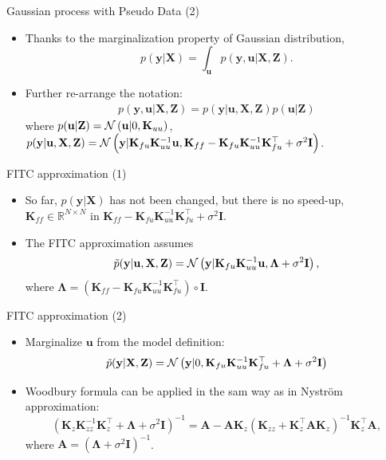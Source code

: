 \documentclass[14pt,aspectratio=1610]{beamer}
\newcommand{\yV}{\mathbf{y}}
\newcommand{\xM}{\mathbf{X}}
\newcommand{\K}{\mathbf{K}}
\newcommand{\R}{\mathbb{R}}
\newcommand{\uV}{\mathbf{u}}
\newcommand{\zM}{\mathbf{Z}}
\newcommand{\I}{\mathbf{I}}
\newcommand{\lambdaM}{\mathbf{\Lambda}}
\newcommand{\aM}{\mathbf{A}}
\begin{document}
\begin{frame}{Gaussian process with Pseudo Data (2)}
\begin{itemize}
\item Thanks to the marginalization property of Gaussian distribution,
\[
p(\yV| \xM) = \int_{\uV} p(\yV, \uV | \xM, \zM).
\]
\item Further re-arrange the notation:
\begin{align*}
p(\yV, \uV| \xM, \zM) = p(\yV| \uV, \xM, \zM) p(\uV| \zM)
\end{align*}
where $p(\uV| \zM) = \gaussianDist{\uV}{0}{\K_{uu}}$, 
$p(\yV| \uV, \xM, \zM)=\gaussianDist{\yV}{\K_{fu} \K_{uu}^{-1} \uV}{\K_{ff} - \K_{fu} \K_{uu}^{-1} \K_{fu}^\top+\sigma^2\I}$.
\end{itemize}
\end{frame}

\begin{frame}{FITC approximation (1)}
\begin{itemize}
\item So far, $p(\yV | \xM)$ has not been changed, but there is no speed-up, $\K_{ff} \in \R^{N\times N}$ in $\K_{ff} - \K_{fu} \K_{uu}^{-1} \K_{fu}^\top+\sigma^2\I$.

\item The FITC approximation assumes
\[
\tilde{p}(\yV| \uV, \xM, \zM)=\gaussianDist{\yV}{\K_{fu} \K_{uu}^{-1} \uV}{\lambdaM +\sigma^2\I},
\]
where $\lambdaM = (\K_{ff} - \K_{fu} \K_{uu}^{-1} \K_{fu}^\top)\circ \I$.
\end{itemize}
\end{frame}

\begin{frame}{FITC approximation (2)}
\begin{itemize}
\item Marginalize $\uV$ from the model definition:
\[
\tilde{p}(\yV| \xM, \zM) = \gaussianDist{\yV}{0}{\K_{fu} \K_{uu}^{-1} \K_{fu}^\top+\lambdaM +\sigma^2\I}
\]

\item Woodbury formula can be applied in the sam way as in Nystr\"{o}m approximation:
\[
(\K_z \K_{zz}^{-1} \K_z^\top+\lambdaM+\sigma^2\I)^{-1} = \aM - \aM \K_z (\K_{zz} + \K_z^\top\aM\K_z)^{-1}\K_z^\top\aM,
\]
where $\aM = (\lambdaM+\sigma^2\I)^{-1}$.
\end{itemize}
\end{frame}
\end{document}
